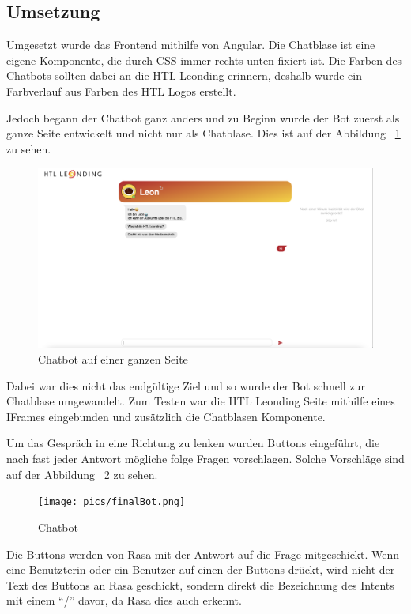 \subsection{Umsetzung}
Umgesetzt wurde das Frontend mithilfe von Angular.
Die Chatblase ist eine eigene Komponente, die durch CSS immer rechts unten fixiert ist.
Die Farben des Chatbots sollten dabei an die HTL Leonding erinnern, deshalb wurde ein Farbverlauf aus Farben des HTL Logos erstellt.

Jedoch begann der Chatbot ganz anders und zu Beginn wurde der Bot zuerst als ganze Seite entwickelt und nicht nur als Chatblase.
Dies ist auf der Abbildung ~\ref{fig:impl:conceptBotFullPage} zu sehen.

\begin{figure}[hbt!]
    \centering
    \includegraphics[scale=0.2]{pics/fullPageBot}
    \caption{Chatbot auf einer ganzen Seite}
    \label{fig:impl:conceptBotFullPage}
\end{figure}

Dabei war dies nicht das endgültige Ziel und so wurde der Bot schnell zur Chatblase umgewandelt.
Zum Testen war die HTL Leonding Seite mithilfe eines IFrames eingebunden und zusätzlich die Chatblasen Komponente.

Um das Gespräch in eine Richtung zu lenken wurden Buttons eingeführt, die nach fast jeder Antwort mögliche folge Fragen vorschlagen.
Solche Vorschläge sind auf der Abbildung ~\ref{fig:impl:bot} zu sehen.

\begin{figure}[hbt!]
    \centering
    \texttt{[image: pics/finalBot.png]}
    \caption{Chatbot}
    \label{fig:impl:bot}
\end{figure}

Die Buttons werden von Rasa mit der Antwort auf die Frage mitgeschickt.
Wenn eine Benutzterin oder ein Benutzer auf einen der Buttons drückt, wird nicht der Text des Buttons an Rasa geschickt, sondern direkt die Bezeichnung des Intents mit einem ``/'' davor, da Rasa dies auch erkennt.

